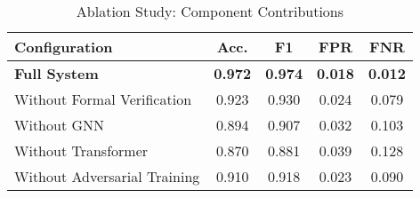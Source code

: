 \begin{table}[h]
\centering
\caption{Ablation Study: Component Contributions}
\begin{tabular}{lcccc}
\toprule
\textbf{Configuration} & \textbf{Acc.} & \textbf{F1} & \textbf{FPR} & \textbf{FNR} \\
\midrule
\textbf{Full System} & \textbf{0.972} & \textbf{0.974} & \textbf{0.018} & \textbf{0.012} \\
\midrule
Without Formal Verification & 0.923 & 0.930 & 0.024 & 0.079 \\
Without GNN & 0.894 & 0.907 & 0.032 & 0.103 \\
Without Transformer & 0.870 & 0.881 & 0.039 & 0.128 \\
Without Adversarial Training & 0.910 & 0.918 & 0.023 & 0.090 \\
\bottomrule
\end{tabular}
\label{tab:ablation}
\end{table}
